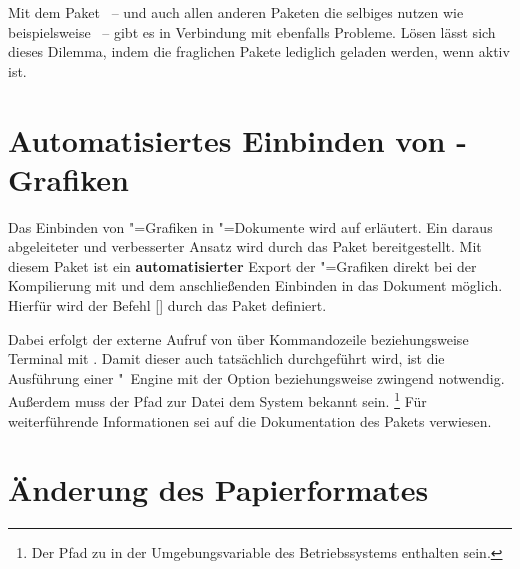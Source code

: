Mit dem Paket ~-- und auch allen anderen Paketen die 
selbiges nutzen wie beispielsweise ~-- gibt es in Verbindung 
mit  ebenfalls Probleme. Lösen lässt sich dieses Dilemma, 
indem die fraglichen Pakete lediglich geladen werden, wenn  
aktiv ist.
%
\begin{quoting}[rightmargin=0pt]
\begin{Code}
\ifpdf
  \usepackage{tikz}%
\fi
\end{Code}
\end{quoting}



\section{%
  Automatisiertes Einbinden von -Grafiken%
  \label{sec:tips:svg}%
}

%
Das Einbinden von "=Grafiken in "=Dokumente
wird auf  erläutert. Ein 
daraus abgeleiteter und verbesserter Ansatz wird durch das Paket  
bereitgestellt. Mit diesem Paket ist ein \textbf{automatisierter} Export der 
"=Grafiken direkt bei der Kompilierung mit  
und dem anschließenden Einbinden in das Dokument möglich. Hierfür wird der 
Befehl [] durch 
das Paket definiert.

Dabei erfolgt der externe Aufruf von  über Kommandozeile 
beziehungsweise Terminal mit . Damit dieser auch tatsächlich 
durchgeführt wird, ist die Ausführung einer "~Engine mit der 
Option  beziehungsweise  
zwingend notwendig. Außerdem muss der Pfad zur Datei  dem 
System bekannt sein.%
\footnote{%
  Der Pfad zu  in der Umgebungsvariable  des 
  Betriebssystems enthalten sein.%
}
Für weiterführende Informationen sei auf die Dokumentation des Pakets 
 verwiesen.



\section{%
  Änderung des Papierformates%
}

